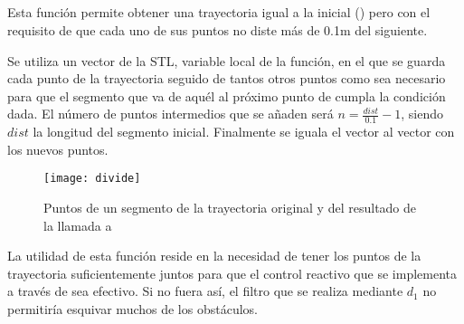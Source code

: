 \subsection{}

\noindent
{}

\noindent
Esta función permite obtener una trayectoria igual a la inicial () pero con el requisito de que cada uno de sus puntos no diste más de 0.1m del siguiente.


\noindent
Se utiliza un vector de la STL, variable local de la función, en el que se guarda cada punto de la trayectoria seguido de tantos otros puntos como sea necesario para que el segmento que va de aquél al próximo punto de  cumpla la condición dada. El número de puntos intermedios que se añaden será $n = \frac{dist}{0.1} - 1$, siendo $dist$ la longitud del segmento inicial. Finalmente se iguala el vector  al vector con los nuevos puntos.

\begin{figure}[h]
  \centering\texttt{[image: divide]}\\
  \caption{Puntos de un segmento de la trayectoria original y del resultado de la llamada a }\label{fg:divide}
\end{figure}

\vspace{0.2cm}

\noindent
La utilidad de esta función reside en la necesidad de tener los puntos de la trayectoria suficientemente juntos para que el control reactivo que se implementa a través de  sea efectivo. Si no fuera así, el filtro que se realiza mediante $d_{1}$ no permitiría esquivar muchos de los obstáculos.

%
%
%


